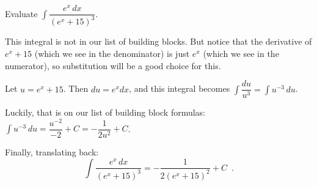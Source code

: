 \begin{example}
Evaluate $\int \dfrac{e^x\,dx}{(e^x+15)^3}$.

\begin{solution}
This integral is not in our list of building blocks. But notice that the derivative of $e^x+15$ (which we see in the denominator) is just $e^x$ (which we see in the numerator), so substitution will be a good choice for this.

Let $u=e^x+15$. Then $du=e^xdx$, and this integral becomes $\int \dfrac{du}{u^3} = \int u^{-3}\,du$.

Luckily, that is on our list of building block formulas: $\int u^{-3}\, du = \dfrac{u^{-2}}{-2}+C = -\dfrac{1}{2u^2} + C$.

Finally, translating back:
$$\int \frac{e^x\,dx}{(e^x+15)^3} = -\frac{1}{2(e^x+15)^2}+C \enspace .$$
\end{solution}\end{example}

